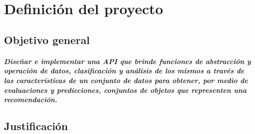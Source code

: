 \chapter {Definici\'on del proyecto}
  \section {Objetivo general}
    \paragraph {Diseñar e implementar una API que brinde funciones de abstracción y operación de datos, clasificación y análisis de los mismos a través de las características de un conjunto de datos para obtener, por medio de evaluaciones y predicciones, conjuntos de objetos que representen una recomendación.}
  
  \section{Justificación}
